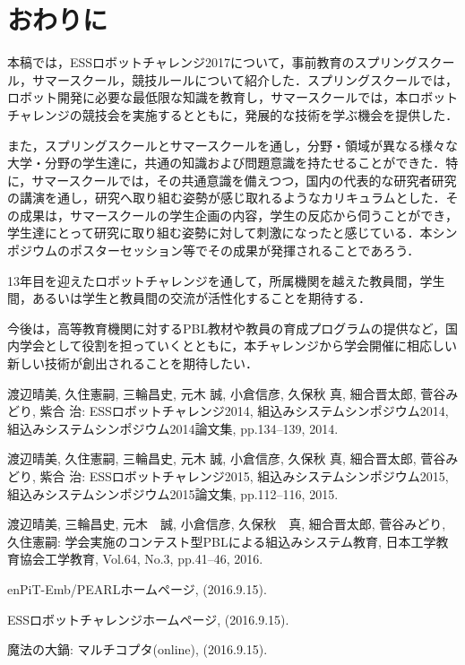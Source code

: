 \documentclass[submit]{ipsj}
\begin{document}
\section{おわりに}

本稿では，ESSロボットチャレンジ2017について，事前教育のスプリングスクール，サマースクール，競技ルールについて紹介した．スプリングスクールでは，ロボット開発に必要な最低限な知識を教育し，サマースクールでは，本ロボットチャレンジの競技会を実施するとともに，発展的な技術を学ぶ機会を提供した．

また，スプリングスクールとサマースクールを通し，分野・領域が異なる様々な大学・分野の学生達に，共通の知識および問題意識を持たせることができた．特に，サマースクールでは，その共通意識を備えつつ，国内の代表的な研究者研究の講演を通し，研究へ取り組む姿勢が感じ取れるようなカリキュラムとした．その成果は，サマースクールの学生企画の内容，学生の反応から伺うことができ，学生達にとって研究に取り組む姿勢に対して刺激になったと感じている．本シンポジウムのポスターセッション等でその成果が発揮されることであろう．

13年目を迎えたロボットチャレンジを通して，所属機関を越えた教員間，学生間，あるいは学生と教員間の交流が活性化することを期待する．

今後は，高等教育機関に対するPBL教材や教員の育成プログラムの提供など，国内学会として役割を担っていくとともに，本チャレンジから学会開催に相応しい新しい技術が創出されることを期待したい．


\begin{thebibliography}{10}

 渡辺晴美, 久住憲嗣, 三輪昌史, 元木 誠, 小倉信彦, 久保秋 真, 細合晋太郎, 菅谷みどり, 紫合 治: ESSロボットチャレンジ2014, 組込みシステムシンポジウム2014, 組込みシステムシンポジウム2014論文集, pp.134--139, 2014.

	渡辺晴美, 久住憲嗣, 三輪昌史, 元木 誠, 小倉信彦, 久保秋 真, 細合晋太郎, 菅谷みどり, 紫合 治: ESSロボットチャレンジ2015, 組込みシステムシンポジウム2015, 組込みシステムシンポジウム2015論文集, pp.112--116, 2015.

 渡辺晴美, 三輪昌史, 元木　誠, 小倉信彦, 久保秋　真, 細合晋太郎, 菅谷みどり, 久住憲嗣: 学会実施のコンテスト型PBLによる組込みシステム教育, 日本工学教育協会工学教育, Vol.64, No.3, pp.41--46, 2016.

 enPiT-Emb/PEARLホームページ,  (2016.9.15).

 ESSロボットチャレンジホームページ,  (2016.9.15).

魔法の大鍋: マルチコプタ(online),
(2016.9.15).

\end{thebibliography}
\end{document}
